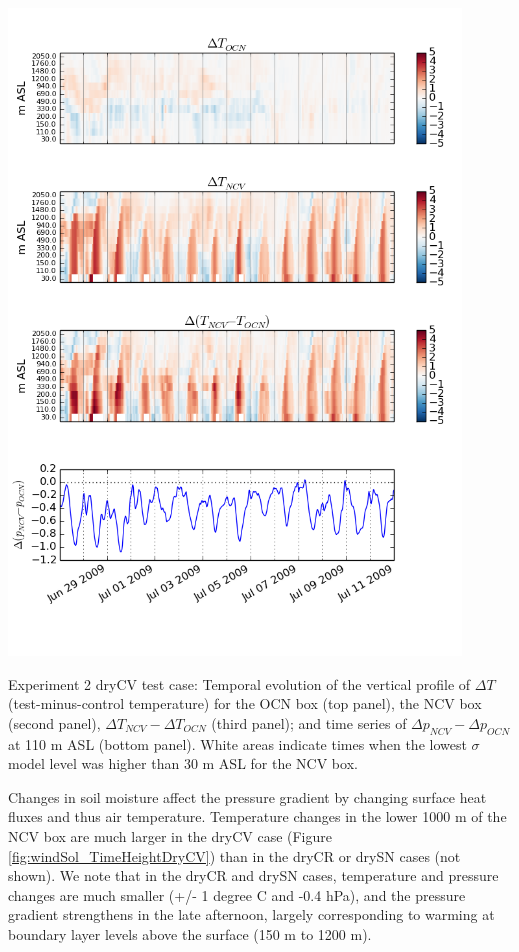 \begin{FPfigure}
\includegraphics[width=0.9\textwidth]{ch3-wind/img/timeheight_T_pdiff_OCN_NCV_diff_dryCV.png}
\caption{Experiment 2 dryCV test case: Temporal evolution of the vertical profile of $\Delta T$ (test-minus-control temperature) for the OCN box (top panel), the NCV box (second panel), $\Delta T_{NCV} - \Delta T_{OCN}$ (third panel); and time series of $\Delta p_{NCV} - \Delta p_{OCN}$ at 110 m ASL (bottom panel).  White areas indicate times when the lowest $\sigma$ model level was higher than 30 m ASL for the NCV box.}
\label{fig:windSol_TimeHeightDryCV}
\end{FPfigure}

Changes in soil moisture affect the pressure gradient by changing surface heat fluxes and thus air temperature.  Temperature changes in the lower 1000 m of the NCV box are much larger in the dryCV case (Figure \ref{fig:windSol_TimeHeightDryCV}) than in the dryCR or drySN cases (not shown).  We note that in the dryCR and drySN cases, temperature and pressure changes are much smaller (+/- 1 degree C and -0.4 hPa), and the pressure gradient strengthens in the late afternoon, largely corresponding to warming at boundary layer levels above the surface (150 m to 1200 m).

